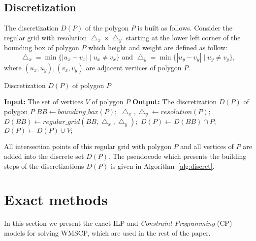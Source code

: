 \documentclass[runningheads,a4paper]{elsarticle}
\begin{document}
	
	\subsection{Discretization}  
	The discretization $D(P)$ of the polygon $P$ is built as follows. Consider the regular grid with resolution $\bigtriangleup_{x}\times\bigtriangleup_{y}$ starting at the lower left corner of the bounding box of polygon $P$ which height and weight are defined as follow: 
	\begin{equation}
         \bigtriangleup_{x}=\min\{ |u_{x}-v_{x}|\mid u_{x}\neq v_{x}\} \mbox{ and }
         \bigtriangleup_{y}=\min\{ |u_{y}-v_{y}|\mid u_{y}\neq v_{y}\},
 	\end{equation}
where $ (u_{x},u_{y}),(v_{x},v_{y})$ are adjacent vertices of polygon $P$.
	
	\begin{algorithm}[!t]
		\caption{Discretization $D(P)$ of polygon $P$}\label{alg:discret}
		\begin{algorithmic}[1]
			\State \textbf{Input:} The set of vertices $V$ of polygon $P$
			\State \textbf{Output:} The discretization $D(P)$ of polygon $P$
			\State $BB \gets bounding\_box(P);$
			\State $\bigtriangleup_{x},\bigtriangleup_{y} \gets resolution(P);$
			\State $D(BB) \gets regular\_grid(BB,\bigtriangleup_{x},\bigtriangleup_{y});$
			\State $D(P) \gets D(BB) \cap P;$
			\State $D(P) \gets D(P) \cup V;$
		\end{algorithmic}
	\end{algorithm}

	All intersection points of this regular grid with polygon $P$ and all vertices of $P$ are added into the discrete set $D(P)$. The pseudocode which presents the building steps of the discretizations $D(P)$ is given in Algorithm~\ref{alg:discret}.
	
	
	\section{Exact methods}
	In this section we present the exact ILP and \emph{Constraint Programming} (CP) models for solving WMSCP, which are used  in the rest of the paper.
\end{document}
